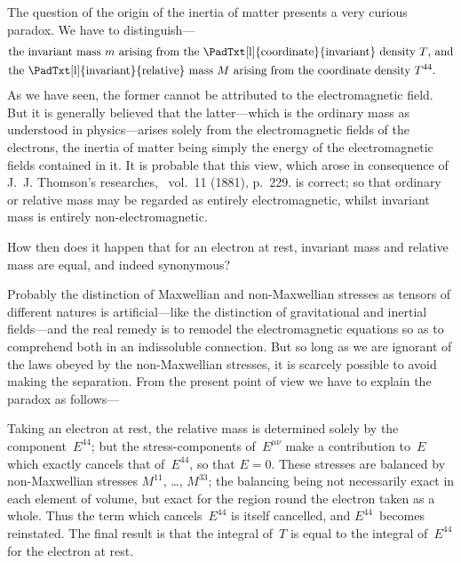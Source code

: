 \documentclass[12pt]{book}
\begin{document}
The question of the origin of the inertia of matter presents a very curious
%
paradox. We have to distinguish---
\begin{align*}
  &\text{the invariant mass~$m$ arising from the \PadTxt[l]{coordinate}{invariant} density~$T$, and} \\
\index{Invariant mass}%
  &\text{the \PadTxt[l]{invariant}{relative} mass~$M$ arising from the coordinate density~$T^{44}$.}
\end{align*}
As we have seen, the former cannot be attributed to the electromagnetic field.
But it is generally believed that the latter---which is the ordinary mass as
understood in physics---arises solely from the electromagnetic fields of the
electrons, the inertia of matter being simply the energy of the electromagnetic
fields contained in it. It is probable that this view, which arose in consequence
of J.~J. Thomson's researches\footnotemark,\footnotetext
  {\ vol.~11 (1881), p.~229.}
is correct; so that ordinary or relative mass
may be regarded as entirely electromagnetic, whilst invariant mass is entirely
non-electromagnetic.

How then does it happen that for an electron at rest, invariant mass and
relative mass are equal, and indeed synonymous?

Probably the distinction of Maxwellian and non-Maxwellian stresses as
%
%
tensors of different natures is artificial---like the distinction of gravitational
and inertial fields---and the real remedy is to remodel the electromagnetic
equations so as to comprehend both in an indissoluble connection. But so
long as we are ignorant of the laws obeyed by the non-Maxwellian stresses, it
is scarcely possible to avoid making the separation. From the present point
of view we have to explain the paradox as follows---

Taking an electron at rest, the relative mass is determined solely by the
component~$E^{44}$; but the stress-components of~$E^{\mu\nu}$ make a contribution to~$E$
which exactly cancels that of~$E^{44}$, so that $E = 0$. These stresses are balanced
by non-Maxwellian stresses $M^{11}$, \dots, $M^{33}$; the balancing being not necessarily
exact in each element of volume, but exact for the region round the electron
taken as a whole. Thus the term which cancels~$E^{44}$ is itself cancelled, and $E^{44}$~becomes
reinstated. The final result is that the integral of~$T$ is equal to the
integral of~$E^{44}$ for the electron at rest.
\end{document}
